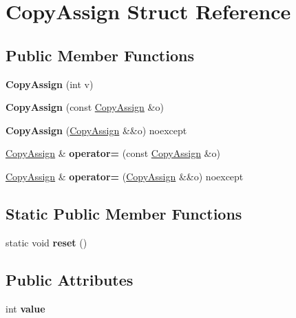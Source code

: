 \hypertarget{struct_copy_assign}{}\section{Copy\+Assign Struct Reference}
\label{struct_copy_assign}
\subsection*{Public Member Functions}
\begin{DoxyCompactItemize}
\item 
\mbox{\label{struct_copy_assign_a26b8e86f848c7621f7d6675c97c810eb}} 
{\bfseries Copy\+Assign} (int v)
\item 
\mbox{\label{struct_copy_assign_af8b073f2d40b8b67bfcf1ebe12b9be71}} 
{\bfseries Copy\+Assign} (const \mbox{\hyperlink{struct_copy_assign}{Copy\+Assign}} \&o)
\item 
\mbox{\label{struct_copy_assign_aad6e64b38e0151dd24098cf7eee3dbe9}} 
{\bfseries Copy\+Assign} (\mbox{\hyperlink{struct_copy_assign}{Copy\+Assign}} \&\&o) noexcept
\item 
\mbox{\label{struct_copy_assign_aec4463f1cde358018202751dd34495ad}} 
\mbox{\hyperlink{struct_copy_assign}{Copy\+Assign}} \& {\bfseries operator=} (const \mbox{\hyperlink{struct_copy_assign}{Copy\+Assign}} \&o)
\item 
\mbox{\label{struct_copy_assign_ac90a2a4316e1cb52ef251366ca7e47f5}} 
\mbox{\hyperlink{struct_copy_assign}{Copy\+Assign}} \& {\bfseries operator=} (\mbox{\hyperlink{struct_copy_assign}{Copy\+Assign}} \&\&o) noexcept
\end{DoxyCompactItemize}
\subsection*{Static Public Member Functions}
\begin{DoxyCompactItemize}
\item 
\mbox{\label{struct_copy_assign_a3d5278c8e789a7e17f3cde5419687131}} 
static void {\bfseries reset} ()
\end{DoxyCompactItemize}
\subsection*{Public Attributes}
\begin{DoxyCompactItemize}
\item 
\mbox{\label{struct_copy_assign_a715663d5504c69886edc6b9bd7bf9aef}} 
int {\bfseries value}
\end{DoxyCompactItemize}

